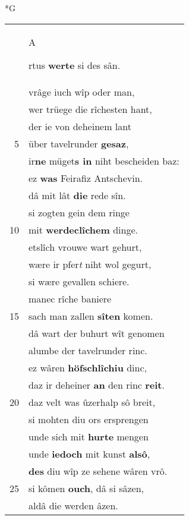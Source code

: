 \documentclass[8pt,a4paper,notitlepage]{article}
\begin{document}
\begin{table}[ht]
\begin{minipage}[t]{0.5\linewidth}
\end{minipage}
\end{table}
\newpage
\begin{table}[ht]
\begin{minipage}[t]{0.5\linewidth}
\small
\begin{center}*G
\end{center}
\begin{tabular}{rl}
 & \begin{large}A\end{large}rtus \textbf{werte} si des sân.\\ 
 & vrâge iuch wîp oder man,\\ 
 & wer trüege die rîchesten hant,\\ 
 & der ie von deheinem lant\\ 
5 & über tavelrunder \textbf{gesaz},\\ 
 & ir\textbf{ne} müget\textbf{s in} niht bescheiden baz:\\ 
 & ez \textbf{was} Feirafiz Antschevin.\\ 
 & dâ mit lât \textbf{die} rede sîn.\\ 
 & si zogten gein dem ringe\\ 
10 & mit \textbf{werdeclîchem} dinge.\\ 
 & etslîch vrouwe wart gehurt,\\ 
 & wære ir pfer\textit{t} niht wol gegurt,\\ 
 & si wære gevallen schiere.\\ 
 & manec rîche baniere\\ 
15 & sach man zallen \textbf{sîten} komen.\\ 
 & dâ wart der buhurt wît genomen\\ 
 & alumbe der tavelrunder rinc.\\ 
 & ez wâren \textbf{höfschlîchiu} dinc,\\ 
 & daz ir deheiner \textbf{an} den rinc \textbf{reit}.\\ 
20 & daz velt was ûzerhalp sô breit,\\ 
 & si mohten diu ors ersprengen\\ 
 & unde sich mit \textbf{hurte} mengen\\ 
 & unde \textbf{iedoch} mit kunst \textbf{alsô},\\ 
 & \textbf{des} diu wîp ze sehene wâren vrô.\\ 
25 & si kômen \textbf{ouch}, dâ si sâzen,\\ 
 & aldâ die werden âzen.\\ 

\end{tabular}
\end{minipage}
\end{table}
\end{document}
